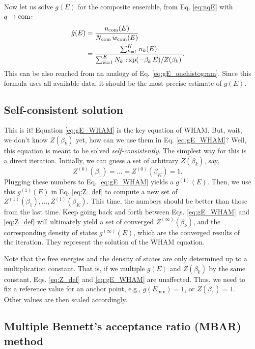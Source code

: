 \documentclass[aip,jcp,preprint,superscriptaddress]{revtex4-1}
\begin{document}
Now let us solve $g(E)$
for the composite ensemble,
from Eq. \eqref{eq:nqE}
with $q \rightarrow \mathrm{com}$:
%
\begin{align}
\hat g(E)
&=
\frac{ n_{\mathrm{com}}(E) }
{ N_{\mathrm{com}} \, w_{\mathrm{com}}(E) }
\notag \\
&=
\frac{ \sum_{k = 1}^K n_k(E) }
{ \sum_{k = 1}^K N_k \, \exp( -\beta_k \, E ) / Z(\beta_k) }.
\label{eq:gE_WHAM}
\end{align}
%
This can be also reached from an analogy
of Eq. \eqref{eq:gE_onehistogram}.
%
Since this formula uses all available data,
it should be the most precise estimate of $g(E)$.




\subsection{\label{sec:WHAM_selfconsistent}
Self-consistent solution}



This is it!
%
Equation \eqref{eq:gE_WHAM} is the key equation of WHAM.
%
But, wait, we don't know $Z(\beta_k)$ yet,
how can we use them in Eq. \eqref{eq:gE_WHAM}?
%
Well, this equation is meant to be solved
\emph{self-consistently}.
%
The simplest way for this is a direct iteration.
%
Initially,
we can guess a set of arbitrary
$Z(\beta_k)$,
say,
\[
  Z^{(0)}(\beta_1) = \dots = Z^{(0)}(\beta_K) = 1.
\]
%
Plugging these numbers to Eq. \eqref{eq:gE_WHAM}
yields a $g^{(1)}(E)$.
%
Then, we use this $g^{(1)}(E)$ in Eq. \eqref{eq:Z_def}
to compute a new set of
$Z^{(1)}(\beta_1), \dots, Z^{(1)}(\beta_K)$.
%
This time, the numbers should be better
than those from the last time.
%
Keep going back and forth
between Eqs. \eqref{eq:gE_WHAM} and \eqref{eq:Z_def}
will ultimately yield a set of converged
$Z^{(\infty)}(\beta_k)$,
and the corresponding density of states
$g^{(\infty)}(E)$,
which are the converged results of the iteration.
%
They represent the solution of the WHAM equation.



Note that the free energies and the density of states
are only determined up to a multiplication constant.
%
That is,
if we multiple $g(E)$ and $Z(\beta_k)$
by the same constant,
Eqs. \eqref{eq:Z_def} and \eqref{eq:gE_WHAM}
are unaffected.
%
Thus, we need to
fix a reference value for an anchor point,
e.g.,
$g(E_{\min}) = 1$,
or
$Z(\beta_1) = 1$.
%
Other values are then scaled accordingly.



\subsection{\label{sec:MBAR}
Multiple Bennett's acceptance ratio (MBAR) method}
\end{document}
